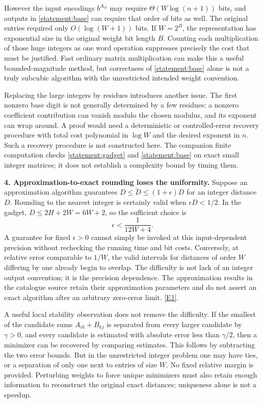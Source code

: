 \documentclass[11pt,a4paper]{article}
\newcommand{\eref}[2]{\hyperlink{extra:#1:#2}{[E#2]}}
\numberwithin{equation}{section}
\begin{document}
However the input encodings $b^{A_{ik}}$ may require
$\Theta(W\log(n+1))$ bits, and outputs in \eqref{statement:base} can require
that order of bits as well. The original entries required only
$O(\log(W+1))$ bits. If $W=2^B$, the representation has exponential
size in the original weight bit length $B$. Counting each multiplication
of those huge integers as one word operation suppresses precisely the
cost that must be justified. Fast ordinary matrix multiplication can
make this a useful bounded-magnitude method, but correctness of
\eqref{statement:base} alone is not a truly subcubic algorithm with the
unrestricted intended weight convention.

Replacing the large integers by residues introduces another issue. The
first nonzero base digit is not generally determined by a few residues:
a nonzero coefficient contribution can vanish modulo the chosen modulus,
and its exponent can wrap around. A proof would need a deterministic
or controlled-error recovery procedure with total cost polynomial in
$\log W$ and the desired exponent in $n$. Such a recovery procedure is
not constructed here. The companion finite computation checks
\eqref{statement:gadget} and \eqref{statement:base} on exact small integer matrices;
it does not establish a complexity bound by timing them.

\textbf{4. Approximation-to-exact rounding loses the uniformity.}
Suppose an approximation algorithm guarantees
$D\leq\widetilde D\leq(1+\epsilon)D$ for an integer distance $D$.
Rounding to the nearest integer is certainly valid when
$\epsilon D<1/2$. In the gadget, $D\leq2H+2W=6W+2$,
so the sufficient choice is
\begin{equation}\label{statement:rounding}
 \epsilon<\frac1{12W+4}.
\end{equation}
A guarantee for fixed $\epsilon>0$ cannot simply be invoked at this
input-dependent precision without rechecking the running time and bit
costs. Conversely, at relative error comparable to $1/W$, the valid
intervals for distances of order $W$ differing by one already begin to
overlap. The difficulty is not lack of an integer output convention;
it is the precision dependence. The approximation results in the
catalogue source retain their approximation parameters and do not assert
an exact algorithm after an arbitrary zero-error limit.
\eref{statement}{1}.

A useful local stability observation does not remove the difficulty.
If the smallest of the candidate sums $A_{ik}+B_{kj}$ is separated
from every larger candidate by $\gamma>0$, and every candidate is
estimated with absolute error less than $\gamma/2$, then a minimizer
can be recovered by comparing estimates. This follows by subtracting
the two error bounds. But in the unrestricted integer problem one
may have ties, or a separation of only one next to entries of size
$W$. No fixed relative margin is provided. Perturbing weights to force
unique minimizers must also retain enough information to reconstruct
the original exact distances; uniqueness alone is not a speedup.
\end{document}
